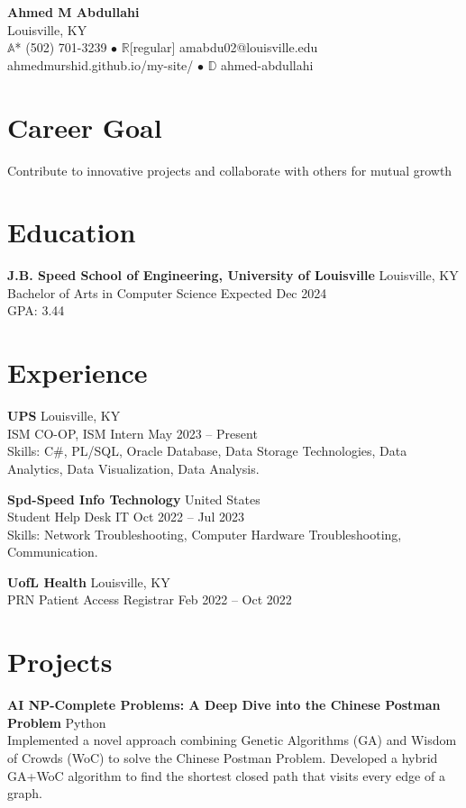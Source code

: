 \documentclass{article}
\begin{document}
\begin{center}
   \huge\textbf{Ahmed M Abdullahi}\\
   \small Louisville, KY\\
   \small $\mathbb{A}$* (502) 701-3239 $\bullet$ $\mathbb{R}$[regular] amabdu02@louisville.edu\\
   \small ahmedmurshid.github.io/my-site/ $\bullet$ $\mathbb{D}$ ahmed-abdullahi
\end{center}

\section*{Career Goal}
Contribute to innovative projects and collaborate with others for mutual growth

\section*{Education}
\textbf{J.B. Speed School of Engineering, University of Louisville} \hfill Louisville, KY\\
Bachelor of Arts in Computer Science \hfill Expected Dec 2024\\
GPA: 3.44

\section*{Experience}
\textbf{UPS} \hfill Louisville, KY\\
ISM CO-OP, ISM Intern \hfill May 2023 -- Present\\
Skills: C\#, PL/SQL, Oracle Database, Data Storage Technologies, Data Analytics, Data Visualization, Data Analysis.

\textbf{Spd-Speed Info Technology} \hfill United States\\
Student Help Desk IT \hfill Oct 2022 -- Jul 2023\\
Skills: Network Troubleshooting, Computer Hardware Troubleshooting, Communication.

\textbf{UofL Health} \hfill Louisville, KY\\
PRN Patient Access Registrar \hfill Feb 2022 -- Oct 2022

\section*{Projects}
\textbf{AI NP-Complete Problems: A Deep Dive into the Chinese Postman Problem} \hfill Python\\
Implemented a novel approach combining Genetic Algorithms (GA) and Wisdom of Crowds (WoC) to solve the Chinese Postman Problem. Developed a hybrid GA+WoC algorithm to find the shortest closed path that visits every edge of a graph.
\end{document}
